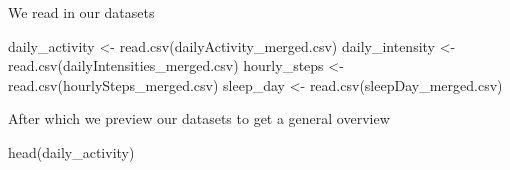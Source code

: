 \documentclass[
]{article}
\newenvironment{Shaded}{\begin{snugshade}}{\end{snugshade}}
\newcommand{\FunctionTok}[1]{\textcolor[rgb]{0.00,0.00,0.00}{#1}}
\newcommand{\NormalTok}[1]{#1}
\newcommand{\OtherTok}[1]{\textcolor[rgb]{0.56,0.35,0.01}{#1}}
\newcommand{\StringTok}[1]{\textcolor[rgb]{0.31,0.60,0.02}{#1}}
\begin{document}
We read in our datasets

\begin{Shaded}
\begin{Highlighting}[]
\NormalTok{daily\_activity }\OtherTok{\textless{}{-}} \FunctionTok{read.csv}\NormalTok{(}\StringTok{\textquotesingle{}dailyActivity\_merged.csv\textquotesingle{}}\NormalTok{)}
\NormalTok{daily\_intensity }\OtherTok{\textless{}{-}} \FunctionTok{read.csv}\NormalTok{(}\StringTok{\textquotesingle{}dailyIntensities\_merged.csv\textquotesingle{}}\NormalTok{)}
\NormalTok{hourly\_steps }\OtherTok{\textless{}{-}} \FunctionTok{read.csv}\NormalTok{(}\StringTok{\textquotesingle{}hourlySteps\_merged.csv\textquotesingle{}}\NormalTok{)}
\NormalTok{sleep\_day }\OtherTok{\textless{}{-}} \FunctionTok{read.csv}\NormalTok{(}\StringTok{\textquotesingle{}sleepDay\_merged.csv\textquotesingle{}}\NormalTok{)}
\end{Highlighting}
\end{Shaded}

After which we preview our datasets to get a general overview

\begin{Shaded}
\begin{Highlighting}[]
\FunctionTok{head}\NormalTok{(daily\_activity)}
\end{Highlighting}
\end{Shaded}
\end{document}
